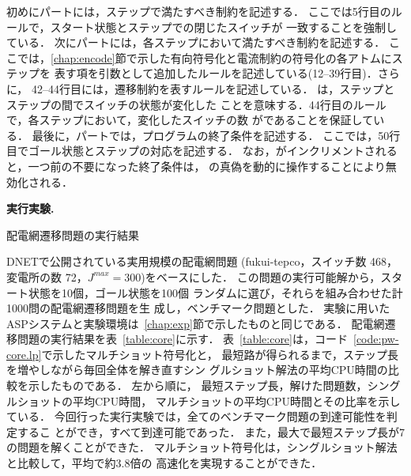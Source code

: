 初めにパートには，ステップで満たすべき制約を記述する．
ここでは5行目のルールで，スタート状態とステップでの閉じたスイッチが
一致することを強制している．
%
次にパートには，各ステップにおいて満たすべき制約を記述する．
ここでは，\ref{chap:encode}節で示した有向符号化と電流制約の符号化の各アトムにステップを
表す項を引数として追加したルールを記述している(12--39行目)．さらに，
42--44行目には，遷移制約を表すルールを記述している．
は，ステップとステップの間でスイッチの状態が変化した
ことを意味する．44行目のルールで，各ステップにおいて，変化したスイッチの数
がであることを保証している．
%
最後に，パートでは，プログラムの終了条件を記述する．
ここでは，50行目でゴール状態とステップの対応を記述する．
なお，がインクリメントされると，一つ前の不要になった終了条件は，
の真偽を動的に操作することにより無効化される．

\textbf{実行実験.}
\begin{table*}[t]
  \centering
  \caption{配電網遷移問題の実行結果}
  \label{table:core}
  
\end{table*}
%
DNETで公開されている実用規模の配電網問題
({\sf fukui-tepco}，スイッチ数 468，変電所の数 72，$J^{max}=300$)をベースにした．
この問題の実行可能解から，スタート状態を10個，ゴール状態を100個
ランダムに選び，それらを組み合わせた計1000問の配電網遷移問題を生
成し，ベンチマーク問題とした．
実験に用いたASPシステムと実験環境は~\ref{chap:exp}節で示したものと同じである．
配電網遷移問題の実行結果を表~\ref{table:core}に示す．
表~\ref{table:core}は，コード~\ref{code:pw-core.lp}で示したマルチショット符号化と，
最短路が得られるまで，ステップ長を増やしながら毎回全体を解き直すシン
グルショット解法の平均CPU時間の比較を示したものである．
左から順に，
最短ステップ長，解けた問題数，シングルショットの平均CPU時間，
マルチショットの平均CPU時間とその比率を示している．
今回行った実行実験では，全てのベンチマーク問題の到達可能性を判定するこ
とができ，すべて到達可能であった．
また，最大で最短ステップ長が7の問題を解くことができた．
マルチショット符号化は，シングルショット解法と比較して，平均で約3.8倍の
高速化を実現することができた．



